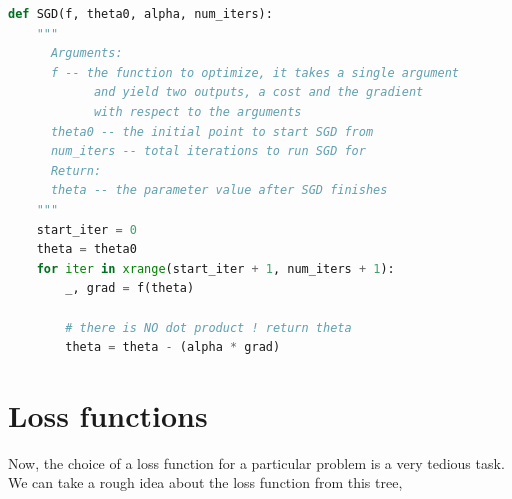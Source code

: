 \begin{lstlisting}[language=Python]
def SGD(f, theta0, alpha, num_iters):
    """
      Arguments:
      f -- the function to optimize, it takes a single argument
            and yield two outputs, a cost and the gradient
            with respect to the arguments
      theta0 -- the initial point to start SGD from
      num_iters -- total iterations to run SGD for
      Return:
      theta -- the parameter value after SGD finishes
    """
    start_iter = 0
    theta = theta0
    for iter in xrange(start_iter + 1, num_iters + 1):
        _, grad = f(theta)
  
        # there is NO dot product ! return theta
        theta = theta - (alpha * grad)
\end{lstlisting}



\section{Loss functions }
Now, the choice of a loss function for a particular problem is a very tedious task. We can take a rough idea about the loss function from this tree,\\

